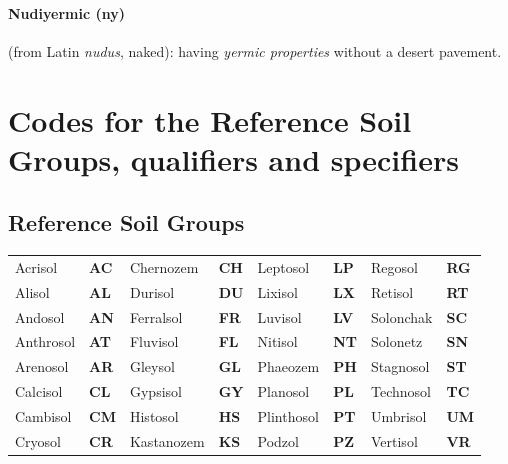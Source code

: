 \documentclass[
  letterpaper,
  DIV=11,
  numbers=noendperiod]{scrreprt}
\begin{document}
\hypertarget{nudiyermic-ny}{%
\subsubsection{Nudiyermic (ny)}\label{nudiyermic-ny}}

(from Latin \emph{nudus}, naked): having \emph{yermic properties}
without a desert pavement.


\hypertarget{codes-for-the-reference-soil-groups-qualifiers-and-specifiers}{%
\chapter{Codes for the Reference Soil Groups, qualifiers and
specifiers}\label{codes-for-the-reference-soil-groups-qualifiers-and-specifiers}}

\hypertarget{reference-soil-groups}{%
\section{Reference Soil Groups}\label{reference-soil-groups}}

\begin{longtable}[]{@{}
  >{\raggedright\arraybackslash}p{}
  >{\raggedright\arraybackslash}p{}
  >{\raggedright\arraybackslash}p{}
  >{\raggedright\arraybackslash}p{}
  >{\raggedright\arraybackslash}p{}
  >{\raggedright\arraybackslash}p{}
  >{\raggedright\arraybackslash}p{}
  >{\raggedright\arraybackslash}p{}@{}}
\toprule()
\endhead
Acrisol & \textbf{AC} & Chernozem & \textbf{CH} & Leptosol & \textbf{LP}
& Regosol & \textbf{RG} \\
Alisol & \textbf{AL} & Durisol & \textbf{DU} & Lixisol & \textbf{LX} &
Retisol & \textbf{RT} \\
Andosol & \textbf{AN} & Ferralsol & \textbf{FR} & Luvisol & \textbf{LV}
& Solonchak & \textbf{SC} \\
Anthrosol & \textbf{AT} & Fluvisol & \textbf{FL} & Nitisol & \textbf{NT}
& Solonetz & \textbf{SN} \\
Arenosol & \textbf{AR} & Gleysol & \textbf{GL} & Phaeozem & \textbf{PH}
& Stagnosol & \textbf{ST} \\
Calcisol & \textbf{CL} & Gypsisol & \textbf{GY} & Planosol & \textbf{PL}
& Technosol & \textbf{TC} \\
Cambisol & \textbf{CM} & Histosol & \textbf{HS} & Plinthosol &
\textbf{PT} & Umbrisol & \textbf{UM} \\
Cryosol & \textbf{CR} & Kastanozem & \textbf{KS} & Podzol & \textbf{PZ}
& Vertisol & \textbf{VR} \\
\bottomrule()
\end{longtable}
\end{document}
